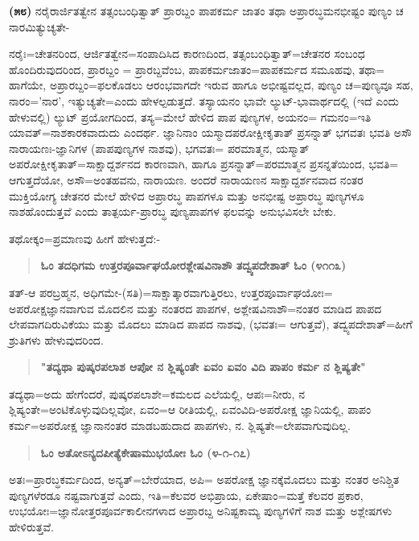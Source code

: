 \textbf{(೫೮)} ನರೈರಾರ್ಜಿತತ್ವೇನ ತತ್ಸಂಬಂಧಿತ್ವಾತ್ ಪ್ರಾರಬ್ದಂ ಪಾಪಕರ್ಮ ಜಾತಂ ತಥಾ ಅಪ್ರಾರಬ್ಧಮನಭೀಷ್ಟಂ ಪುಣ್ಯಂ ಚ ನಾರಮಿತ್ಯುಚ್ಯತೇ-

ನರೈಃ=ಚೇತನರಿಂದ, ಆರ್ಜಿತತ್ವೇನ=ಸಂಪಾದಿಸಿದ ಕಾರಣದಿಂದ, ತತ್ಸಂಬಂಧಿತ್ವಾತ್=\break ಚೇತನರ ಸಂಬಂಧ ಹೊಂದಿರುವುದರಿಂದ, ಪ್ರಾರಬ್ದಂ = ಪ್ರಾರಬ್ದವೆಂಬ, ಪಾಪಕರ್ಮಜಾತಂ=ಪಾಪಕರ್ಮದ ಸಮೂಹವು, ತಥಾ= ಹಾಗೆಯೇ, ಅಪ್ರಾರಬ್ದಂ=ಫಲಕೊಡಲು ಆರಂಭವಾಗದೇ ಇರುವ ಹಾಗೂ ಅಭೀಷ್ಟವಲ್ಲದ, ಪುಣ್ಯಂ ಚ=ಪುಣ್ಯವೂ ಸಹ, ನಾರಂ=\break 'ನಾರ', ಇತ್ಯುಚ್ಯತೇ=ಎಂದು ಹೇಳಲ್ಪಡುತ್ತದೆ. ತಸ್ಯಾಯನಂ ಭಾವೇ ಲ್ಯುಟ್-ಭಾವಾರ್ಥದಲ್ಲಿ (ಇದೆ ಎಂದು ಹೇಳುವಲ್ಲಿ) ಲ್ಯುಟ್ ಪ್ರಯೋಗದಿಂದ, ತಸ್ಯ=ಮೇಲೆ ಹೇಳಿದ ಪಾಪ ಪುಣ್ಯಗಳ, ಅಯನಂ= ಗಮನಂ=ಇತಿ ಯಾವತ್=ನಾಶಕಾರಕವಾದುದು ಎಂದರ್ಥ. ಜ್ಞಾನಿನಾಂ ಯಸ್ಮಾದಪರೋಕ್ಷೀಕೃತಾತ್ ಪ್ರಸನ್ನಾತ್ ಭಗವತಃ ಭವತಿ ಅಸೌ ನಾರಾಯಣಃ-ಜ್ಞಾನಿಗಳ (ಪಾಪಪುಣ್ಯಗಳ ನಾಶವು), ಭಗವತಃ= ಪರಮಾತ್ಮನ, ಯಸ್ಮಾತ್ ಅಪರೋಕ್ಷೀ\-ಕೃತಾತ್=ಸಾಕ್ಷಾದ್ದರ್ಶನದ ಕಾರಣವಾಗಿ, ಹಾಗೂ ಪ್ರಸನ್ನಾತ್=ಪರಮಾತ್ಮನ ಪ್ರಸನ್ನತೆಯಿಂದ, ಭವತಿ= ಆಗುತ್ತದೆಯೋ, ಅಸೌ=ಅಂತಹವನು, ನಾರಾಯಣ. ಅಂದರೆ ನಾರಾಯಣನ ಸಾಕ್ಷಾದ್ದರ್ಶನವಾದ ನಂತರ ಮುಕ್ತಿಯೋಗ್ಯ ಚೇತನರ ಮೇಲೆ ಹೇಳಿದ ಅಪ್ರಾರಬ್ಧ ಪಾಪಗಳೂ ಮತ್ತು ಅನಭೀಷ್ಟ ಅಪ್ರಾರಬ್ಧ ಪುಣ್ಯಗಳೂ ನಾಶಹೊಂದುತ್ತವೆ ಎಂದು ತಾತ್ಪರ್ಯ-ಪ್ರಾರಬ್ಧ ಪುಣ್ಯಪಾಪಗಳ ಫಲವನ್ನು ಅನುಭವಿಸಲೇ ಬೇಕು.

ತಥೋಕ್ಕಂ=ಪ್ರಮಾಣವು ಹೀಗೆ ಹೇಳುತ್ತದೆ:-

\begin{verse}
\textbf{ಓಂ ತದಧಿಗಮ ಉತ್ತರಪೂರ್ವಾಘಯೋರಶ್ಲೇಷವಿನಾಶೌ‌ ತದ್ವ್ಯಪದೇಶಾತ್ ಓಂ (೪\enginline{-}೧\enginline{-}೧೩)}
\end{verse}

ತತ್-ಆ ಪರಬ್ರಹ್ಮನ, ಅಧಿಗಮೇ-(ಸತಿ)=ಸಾಕ್ಷಾತ್ಕಾರವಾಗುತ್ತಿರಲು, ಉತ್ತರಪೂರ್ವಾ\-ಘಯೋಃ= ಅಪರೋಕ್ಷಜ್ಞಾನವಾಗುವ ಮೊದಲಿನ ಮತ್ತು ನಂತರದ ಪಾಪಗಳ, ಅಶ್ಲೇಷ\-ವಿನಾಶೌ=ನಂತರ ಮಾಡಿದ ಪಾಪದ ಲೇಪವಾಗದಿರುವಿಕೆಯು ಮತ್ತು ಮೊದಲು ಮಾಡಿದ ಪಾಪದ ನಾಶವು, (ಭವತಃ= ಆಗುತ್ತವೆ), ತದ್ವ್ಯಪದೇಶಾತ್=ಹೀಗೆ ಶ್ರುತಿಗಳು ಹೇಳುವುದರಿಂದ.

\begin{verse}
\textbf{"ತದ್ಯಥಾ ಪುಷ್ಕರಪಲಾಶ ಆಪೋ ನ ಶ್ಲಿಷ್ಯಂತೇ ಏವಂ ಏವಂ ವಿದಿ ಪಾಪಂ ಕರ್ಮ ನ ಶ್ಲಿಷ್ಯತೇ"}
\end{verse}

ತದ್ಯಥಾ=ಅದು ಹೇಗೆಂದರೆ, ಪುಷ್ಕರಪಲಾಶೇ=ಕಮಲದ ಎಲೆಯಲ್ಲಿ, ಆಪಃ=ನೀರು, ನ ಶ್ಲಿಷ್ಯಂತೇ=ಅಂಟಿಕೊಳ್ಳುವುದಿಲ್ಲವೋ, ಏವಂ=ಆ ರೀತಿಯಲ್ಲಿ, ಏವಂವಿದಿ-ಅಪರೋಕ್ಷ ಜ್ಞಾನಿಯಲ್ಲಿ, ಪಾಪಂ ಕರ್ಮ=ಅಪರೋಕ್ಷ ಜ್ಞಾನಾನಂತರ ಮಾಡಬಹುದಾದ ಪಾಪಗಳು, ನ. ಶ್ಲಿಷ್ಯತೇ=ಲೇಪವಾಗುವುದಿಲ್ಲ.

\begin{verse}
\textbf{ಓಂ ಅತೋಽನ್ಯದಪೀತ್ಯೆಕೇಷಾಮುಭಯೋಃ ಓಂ (೪-೧-೧೭)}
\end{verse}

ಅತಃ=ಪ್ರಾರಬ್ಧಕರ್ಮದಿಂದ, ಅನ್ಯತ್=ಬೇರೆಯಾದ, ಅಪಿ= ಅಪರೋಕ್ಷ ಜ್ಞಾನಕ್ಕೆ\break ಮೊದಲು ಮತ್ತು ನಂತರ ಅನಿಶ್ಚಿತ ಪುಣ್ಯಗಳೆರಡೂ ನಷ್ಟವಾಗುತ್ತವೆ ಎಂದು, ಇತಿ=ಕೆಲವರ ಅಭಿಪ್ರಾಯ, ಏಕೇಷಾಂ=ಮತ್ತೆ ಕೆಲವರ ಪ್ರಕಾರ, ಉಭಯೋಃ=ಜ್ಞಾನೋತ್ತರಪೂರ್ವಕಾಲೀನ\-ಗಳಾದ ಅಪ್ರಾರಬ್ದ ಅನಿಷ್ಟಕಾಮ್ಯ ಪುಣ್ಯಗಳಿಗೆ ನಾಶ ಮತ್ತು ಅಶ್ಲೇಷಗಳು ಹೇಳಿರುತ್ತವೆ.

